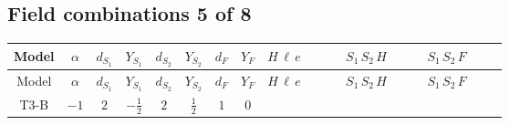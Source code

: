 \documentclass[8pt]{article}
\begin{document}
\begin{landscape}
\subsection*{Field combinations 5 of 8}
\begin{longtable}{@{}cccccccc >{\raggedright\arraybackslash}p{0.21\linewidth} >{\raggedright\arraybackslash}p{0.21\linewidth} >{\raggedright\arraybackslash}p{0.21\linewidth}@{}}
\toprule
Model & $\alpha$ & $d_{S_1}$ & $Y_{S_1}$ & $d_{S_2}$ & $Y_{S_2}$ & $d_F$ & $Y_F$ & $H\,\ell\,e$ & $S_1\,S_2\,H$ & $S_1\,S_2\,F$ \\
\midrule
\endfirsthead
\toprule
Model & $\alpha$ & $d_{S_1}$ & $Y_{S_1}$ & $d_{S_2}$ & $Y_{S_2}$ & $d_F$ & $Y_F$ & $H\,\ell\,e$ & $S_1\,S_2\,H$ & $S_1\,S_2\,F$ \\
\midrule
\endhead
T3-B & $-1$ & $2$ & $-\frac{1}{2}$ & $2$ & $\frac{1}{2}$ & $1$ & $0$ & \scriptsize\adjustbox{max width=\linewidth}{$\begin{gathered} +\frac{\hbar  \overline{y_{1,i_3,r_1}} \overline{L_{a_1,i_2}}\, P_R\, e_{i_1} H_{a_1} y_{1,i_2,r_1} Y_{e,i_3,i_1}}{4 \epsilon } \\ +\frac{3}{8} \hbar  \overline{y_{1,i_3,r_1}} \overline{L_{a_1,i_2}}\, P_R\, e_{i_1} H_{a_1} y_{1,i_2,r_1} Y_{e,i_3,i_1} \\ +\frac{\hbar  \overline{y_{2,i_3,r_1}} \overline{L_{a_1,i_2}}\, P_R\, e_{i_1} H_{a_1} y_{2,i_2,r_1} Y_{e,i_3,i_1}}{4 \epsilon }\end{gathered}$} & \scriptsize\adjustbox{max width=\linewidth}{$\begin{gathered} -\frac{2 \hbar  \overline{y_{2,i_1,r_1}} \overline{Y_{e,i_2,i_3}} H_{a_2} S_{1,j_1} S_{2,j_2} y_{1,i_2,r_1} Y_{e,i_1,i_3} \mathcal{I}_{y_1,a_1,j_1} {\mathcal{C}_{LS_2F}}^{*}_{a_2,j_2} H_{a_1}{}^{\dagger }}{\epsilon } \\ -2 \hbar  \overline{y_{2,i_1,r_1}} \overline{Y_{e,i_2,i_3}} H_{a_2} S_{1,j_1} S_{2,j_2} y_{1,i_2,r_1} Y_{e,i_1,i_3} \mathcal{I}_{y_1,a_1,j_1} {\mathcal{C}_{LS_2F}}^{*}_{a_2,j_2} H_{a_1}{}^{\dagger } \\ +\overline{\lambda_5} S_{2,j_2} {\mathcal{I}_{LLS_1S_2}}^{*}_{a_1,a_2,j_1,j_2} H_{a_1}{}^{\dagger } H_{a_2}{}^{\dagger } S_{1,j_1}{}^{\dagger }\end{gathered}$} & \scriptsize\adjustbox{max width=\linewidth}{$\begin{gathered} -C_{S_2^\dagger S_2} \hbar  \log \left(\frac{\bar{\mu}^{2}}{M_F^2}\right) \overline{y_{2,i_1,r_1}} S_{1,j_1} S_{2,j_2} y_{1,i_1,r_1} \text{Bar}(\text{cg1})_{j_1,j_2} \\ -\hbar  \log \left(\frac{\bar{\mu}^{2}}{M_F^2}\right) \overline{y_{2,i_1,r_1}} \overline{y_{2,i_2,r_2}} S_{1,j_1} S_{1,j_3} S_{2,j_2} S_{2,j_4} y_{1,i_1,r_2} y_{1,i_2,r_1} \text{Bar}(\text{cg1})_{j_1,j_2} \text{Bar}(\text{cg1})_{j_3,j_4} \\ +2 \hbar  \log \left(\frac{\bar{\mu}^{2}}{M_F^2}\right) \overline{y_{1,i_1,r_1}} \overline{y_{2,i_2,r_2}} S_{1,j_1} S_{1,j_2} S_{2,j_3} y_{1,i_1,r_2} y_{1,i_2,r_1} \text{Bar}(\text{cg1})_{j_2,j_3} S_{1,j_1}{}^{\dagger }\end{gathered}$} \\

\end{longtable}
\end{landscape}
\end{document}
